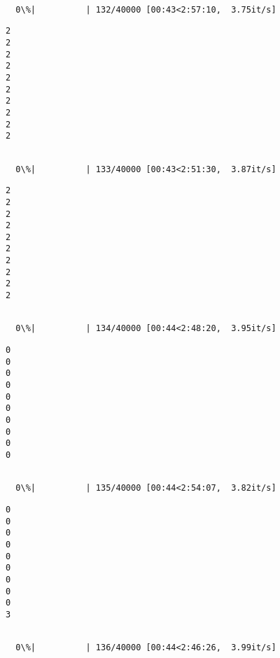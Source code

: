 \documentclass[11pt]{article}
\begin{document}
    \begin{Verbatim}[commandchars=\\\{\}]

  0\%|          | 132/40000 [00:43<2:57:10,  3.75it/s]
    \end{Verbatim}

    \begin{Verbatim}[commandchars=\\\{\}]
2
2
2
2
2
2
2
2
2
2

    \end{Verbatim}

    \begin{Verbatim}[commandchars=\\\{\}]

  0\%|          | 133/40000 [00:43<2:51:30,  3.87it/s]
    \end{Verbatim}

    \begin{Verbatim}[commandchars=\\\{\}]
2
2
2
2
2
2
2
2
2
2

    \end{Verbatim}

    \begin{Verbatim}[commandchars=\\\{\}]

  0\%|          | 134/40000 [00:44<2:48:20,  3.95it/s]
    \end{Verbatim}

    \begin{Verbatim}[commandchars=\\\{\}]
0
0
0
0
0
0
0
0
0
0

    \end{Verbatim}

    \begin{Verbatim}[commandchars=\\\{\}]

  0\%|          | 135/40000 [00:44<2:54:07,  3.82it/s]
    \end{Verbatim}

    \begin{Verbatim}[commandchars=\\\{\}]
0
0
0
0
0
0
0
0
0
3

    \end{Verbatim}

    \begin{Verbatim}[commandchars=\\\{\}]

  0\%|          | 136/40000 [00:44<2:46:26,  3.99it/s]
    \end{Verbatim}
\end{document}
